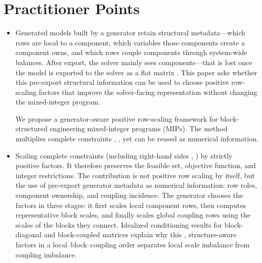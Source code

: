 \documentclass[AMA,Times1COL]{WileyNJDv5} %
\providecommand{\DIFadd}[1]{{\protect\color{blue} \sf #1}} %
\providecommand{\DIFdel}[1]{{\protect\color{red} \scriptsize #1}} %
\providecommand{\DIFaddbegin}{} %
\providecommand{\DIFaddend}{} %
\providecommand{\DIFdelbegin}{} %
\providecommand{\DIFdelend}{} %
\begin{document}
\section*{\DIFadd{Practitioner Points}}
\begin{itemize}
  \item \DIFadd{Generated models built by a generator retain structural metadata---which rows are local
  to a component}\DIFaddend , which variables \DIFdelbegin \DIFdel{those components create}\DIFdelend \DIFaddbegin \DIFadd{a component owns}\DIFaddend , and which rows couple \DIFdelbegin \DIFdel{components through system-wide balances. After export, the solver mainly sees }\DIFdelend \DIFaddbegin \DIFadd{components---that is lost
  once the model is exported to the solver as }\DIFaddend a flat matrix\DIFdelbegin \DIFdel{. This paper asks whether this pre-export structural information can be used to choose positive row-scaling factors that improve the solver-facing representation without changing the mixed-integer program.
}%

\DIFdel{We propose a generator-aware positive row-scaling framework for block-structured engineering mixed-integer programs (MIPs).
  The method multiplies complete constraints , }\DIFdelend \DIFaddbegin \DIFadd{, yet can be reused as numerical
  information.
  }\item \DIFadd{Scaling complete constraints (}\DIFaddend including right-hand sides\DIFdelbegin \DIFdel{, }\DIFdelend \DIFaddbegin \DIFadd{) }\DIFaddend by strictly positive\DIFdelbegin \DIFdel{factors. It therefore preserves the feasible set, objective function, and integer restrictions. The contribution is not positive row scaling by itself, but the use of pre-export generator metadata as numerical information: row roles, component ownership,
  and coupling incidence. The generator chooses the factors in three stages: it first scales local component rows, then computes representative block scales, and finally scales global coupling rows using the scales of the blocks they connect. Idealized conditioning results for block-diagonal and block-coupled matrices explain why this }\DIFdelend \DIFaddbegin \DIFadd{,
  structure-aware factors in a }\DIFaddend local--block--coupling order \DIFdelbegin \DIFdel{separates local scale imbalance from coupling imbalance.
}%


\end{itemize}
\end{document}
